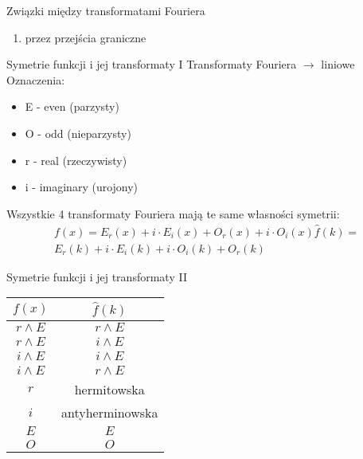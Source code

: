 \begin{frame}{Związki między transformatami Fouriera}
	\begin{enumerate}
		\item przez przejścia graniczne
	\end{enumerate}
\end{frame}
\begin{frame}{Symetrie funkcji i jej transformaty I}
	Transformaty Fouriera $\to$ liniowe
	\\ Oznaczenia:
	\begin{itemize}
		\item E - even (parzysty)
		\item O - odd (nieparzysty)
		\item r - real (rzeczywisty)
		\item i - imaginary (urojony)
	\end{itemize}
	Wszystkie 4 transformaty Fouriera mają te same własności symetrii:
	\begin{align*}
		f(x) = E_r(x) + i \cdot E_i(x) + O_r(x) + i \cdot O_i(x) \widehat{f}(k) =
		\tag{16.5} \\
		E_r(k) + i \cdot E_i(k) + i \cdot O_i(k) + O_r(k)
		\tag{16.6}
	\end{align*}
\end{frame}
\begin{frame}{Symetrie funkcji i jej transformaty II}
	\begin{table}
		\centering
		\begin{tabular}{|c|c|}
			\hline
			$f(x)$ & $\widehat{f}(k)$ \\
			\hline
			\hline
			$r \land E$ & $r \land E$ \\
			\hline
			$r \land E$ & $i \land E$ \\
			\hline
			$i \land E$ & $i \land E$ \\
			\hline
			$i \land E$ & $r \land E$ \\
			\hline
			$r$ & hermitowska \\
			\hline
			$i$ & antyherminowska \\
			\hline
			$E$ & $E$ \\
			\hline
			$O$ & $O$ \\
			\hline
		\end{tabular}
	\end{table}
\end{frame}
